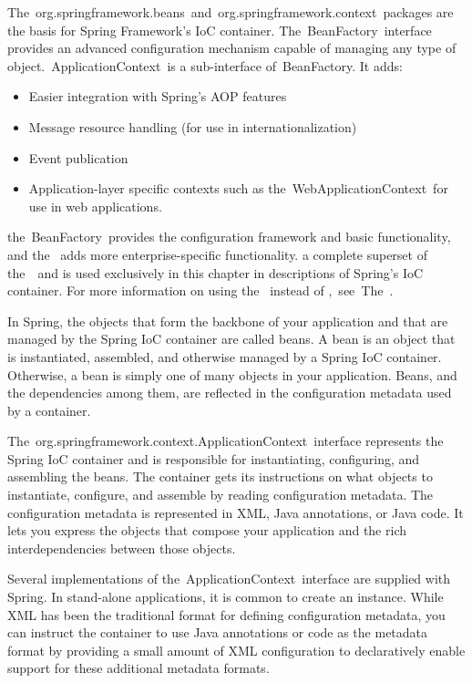 The org.springframework.beans and org.springframework.context packages are the basis for Spring Framework’s IoC container. The BeanFactory interface provides an advanced configuration mechanism capable of managing any type of object. ApplicationContext is a sub-interface of BeanFactory. It adds:

\begin{itemize}
  \item Easier integration with Spring's AOP features
  \item Message resource handling (for use in internationalization)
  \item Event publication
  \item Application-layer specific contexts such as the WebApplicationContext for use in web applications.
\end{itemize}

the BeanFactory provides the configuration framework and basic functionality, and the  adds more enterprise-specific functionality.  a complete superset of the  and is used exclusively in this chapter in descriptions of Spring’s IoC container. For more information on using the  instead of , see The .

In Spring, the objects that form the backbone of your application and that are managed by the Spring IoC container are called beans. A bean is an object that is instantiated, assembled, and otherwise managed by a Spring IoC container. Otherwise, a bean is simply one of many objects in your application. Beans, and the dependencies among them, are reflected in the configuration metadata used by a container.


The org.springframework.context.ApplicationContext interface represents the Spring IoC container and is responsible for instantiating, configuring, and assembling the beans. The container gets its instructions on what objects to instantiate, configure, and assemble by reading configuration metadata. The configuration metadata is represented in XML, Java annotations, or Java code. It lets you express the objects that compose your application and the rich interdependencies between those objects.

Several implementations of the ApplicationContext interface are supplied with Spring. In stand-alone applications, it is common to create an instance. While XML has been the traditional format for defining configuration metadata, you can instruct the container to use Java annotations or code as the metadata format by providing a small amount of XML configuration to declaratively enable support for these additional metadata formats.

